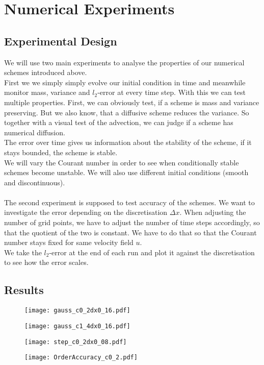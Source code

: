 \section{Numerical Experiments}
\subsection{Experimental Design}
We will use two main experiments to analyse the properties of our numerical schemes introduced above. \\
First we we simply simply evolve our initial condition in time and meanwhile monitor mass, variance and $l_2$-error at every time step. 
With this we can test multiple properties. First, we can obviously test, if a scheme is mass and variance preserving. But we also know, that a diffusive scheme reduces the variance. So together with a visual test of the advection, we can judge if a scheme has numerical diffusion. \\
The error over time gives us information about the stability of the scheme, if it stays bounded, the scheme is stable. \\
We will vary the Courant number in order to see when conditionally stable schemes become unstable. We will also use different initial conditions (smooth and discontinuous).\\ \\
The second experiment is supposed to test accuracy of the schemes. We want to investigate the error depending on the discretisation $\Delta x$. When adjusting the number of grid points, we have to adjust the number of time steps accordingly, so that the quotient of the two is constant. We have to do that so that the  Courant number stays fixed for same velocity field $u$. \\
We take the $l_2$-error at the end of each run and plot it against the discretisation to see how the error scales.
\subsection{Results}
\FloatBarrier
\begin{figure}
\centering
\texttt{[image: gauss\_c0\_2dx0\_16.pdf]}
\caption{}
\texttt{[image: gauss\_c1\_4dx0\_16.pdf]}
\caption{}
\end{figure}
\FloatBarrier
\begin{figure}
\centering
\texttt{[image: step\_c0\_2dx0\_08.pdf]}
\caption{}
\texttt{[image: OrderAccuracy\_c0\_2.pdf]}
\caption{}
\end{figure}
\FloatBarrier